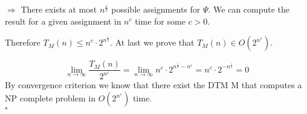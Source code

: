 \documentclass[11pt,a4paper,ngerman]{article}
\begin{document}
$\Rightarrow$ There exists at most $n^\frac{\varepsilon}{2}$ possible assignments for $\Psi$. We can
compute the result for a given assignment in $n^c$ time for some $c > 0$.

Therefore $T_M (n) \leq n^c \cdot 2^{n^\frac{\varepsilon}{2}}$. At last we prove that $T_M(n) \in O(2^{n^\varepsilon})$.

$$
\lim_{n\rightarrow \infty} \frac{T_M (n)}{2^{n^\varepsilon}} = \lim_{n \rightarrow \infty} n^c \cdot 2^{n^\frac{\varepsilon}{2} - n^\varepsilon}
= n^c \cdot 2^{-n^\frac{\varepsilon}{2}} = 0
$$
By convergence criterion we know that there exist the DTM M that computes a NP complete problem in $O(2^{n^\varepsilon})$ time.\\
\mbox{} \hfill $\square$

\label{LastPage}
\end{document}
